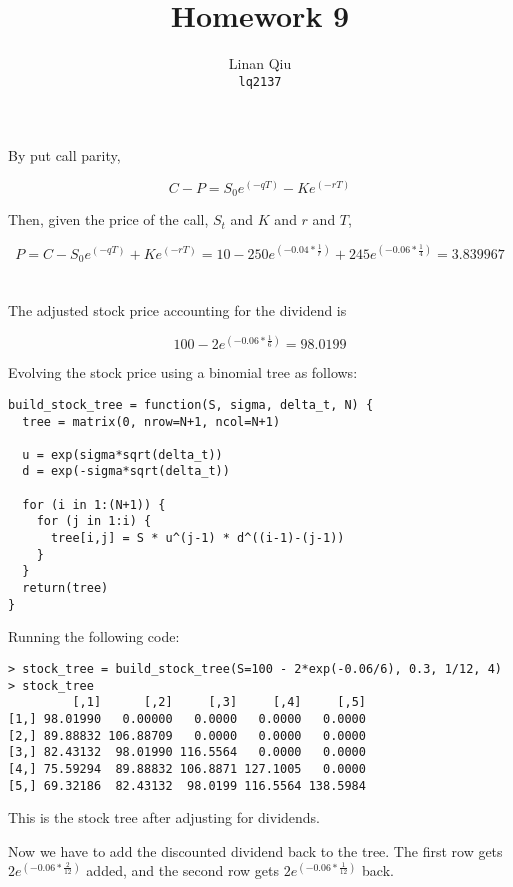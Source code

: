 \documentclass[11pt]{scrartcl}
\title{Homework 9}
\author{Linan Qiu\\\texttt{lq2137}}
\newcommand{\epower}[1]{\ensuremath{e^{\left(#1\right)}}}
\begin{document}
\maketitle

\section{}

By put call parity,

\[C - P = S_0\epower{-qT} - K\epower{-rT}\]

Then, given the price of the call, $S_t$ and $K$ and $r$ and $T$,

\[P = C - S_0\epower{-qT} + K\epower{-rT} = 10 - 250\epower{-0.04*\frac{1}{r}} + 245\epower{-0.06*\frac{1}{4}} = 3.839967\]

\section{}

The adjusted stock price accounting for the dividend is

\[100 - 2\epower{-0.06*\frac{1}{6}} = 98.0199\]

Evolving the stock price using a binomial tree as follows:

\begin{lstlisting}
build_stock_tree = function(S, sigma, delta_t, N) {
  tree = matrix(0, nrow=N+1, ncol=N+1)
  
  u = exp(sigma*sqrt(delta_t))
  d = exp(-sigma*sqrt(delta_t))
  
  for (i in 1:(N+1)) {
    for (j in 1:i) {
      tree[i,j] = S * u^(j-1) * d^((i-1)-(j-1))
    }
  }
  return(tree)
}
\end{lstlisting}

Running the following code:

\begin{lstlisting}
> stock_tree = build_stock_tree(S=100 - 2*exp(-0.06/6), 0.3, 1/12, 4)
> stock_tree
         [,1]      [,2]     [,3]     [,4]     [,5]
[1,] 98.01990   0.00000   0.0000   0.0000   0.0000
[2,] 89.88832 106.88709   0.0000   0.0000   0.0000
[3,] 82.43132  98.01990 116.5564   0.0000   0.0000
[4,] 75.59294  89.88832 106.8871 127.1005   0.0000
[5,] 69.32186  82.43132  98.0199 116.5564 138.5984
\end{lstlisting}

This is the stock tree after adjusting for dividends.

Now we have to add the discounted dividend back to the tree. The first row gets $2\epower{-0.06*\frac{2}{12}}$ added, and the second row gets $2\epower{-0.06*\frac{1}{12}}$ back.
\end{document}

